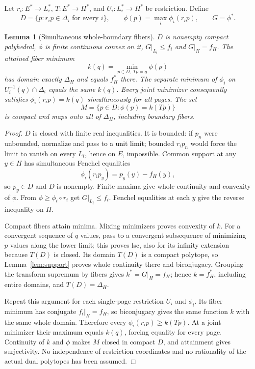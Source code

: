 \documentclass[11pt]{article}
\newtheorem{lemma}[theorem]{Lemma}
\begin{document}
Let $r_i:E^*\to L_i^*$, $T:E^*\to H^*$, and $U_i:L_i^*\to H^*$ be restriction. Define
\[
D=\{p:r_i p\in\Delta_i\text{ for every }i\},\qquad
\phi(p)=\max_i\phi_i(r_i p),\qquad G=\phi^*.
\]
\begin{lemma}[Simultaneous whole-boundary fibers]\label{lem:fibers}
$D$ is nonempty compact polyhedral, $\phi$ is finite continuous convex on it, $G|_{L_i}\leq f_i$ and $G|_H=f_H$. The attained fiber minimum
\[
k(q)=\min_{p\in D,\ Tp=q}\phi(p)
\]
has domain exactly $\Delta_H$ and equals $f_H^*$ there. The separate minimum of $\phi_i$ on $U_i^{-1}(q)\cap\Delta_i$ equals the same $k(q)$. Every joint minimizer consequently satisfies $\phi_i(r_i p)=k(q)$ simultaneously for all pages. The set
\[
M=\{p\in D:\phi(p)=k(Tp)\}
\]
is compact and maps onto all of $\Delta_H$, including boundary fibers.
\end{lemma}
\begin{proof}
$D$ is closed with finite real inequalities. It is bounded: if $p_n$ were unbounded, normalize and pass to a unit limit; bounded $r_i p_n$ would force the limit to vanish on every $L_i$, hence on $E$, impossible. Common support at any $y\in H$ has simultaneous Fenchel equalities
\[
\phi_i(r_i p_y)=p_y(y)-f_H(y),
\]
so $p_y\in D$ and $D$ is nonempty. Finite maxima give whole continuity and convexity of $\phi$. From $\phi\geq\phi_i\circ r_i$ get $G|_{L_i}\leq f_i$. Fenchel equalities at each $y$ give the reverse inequality on $H$.

Compact fibers attain minima. Mixing minimizers proves convexity of $k$. For a convergent sequence of $q$ values, pass to a convergent subsequence of minimizing $p$ values along the lower limit; this proves lsc, also for its infinity extension because $T(D)$ is closed. Its domain $T(D)$ is a compact polytope, so Lemma~\ref{lem:support} proves whole continuity there and biconjugacy. Grouping the transform supremum by fibers gives $k^*=G|_H=f_H$; hence $k=f_H^*$, including entire domains, and $T(D)=\Delta_H$.

Repeat this argument for each single-page restriction $U_i$ and $\phi_i$. Its fiber minimum has conjugate $f_i|_H=f_H$, so biconjugacy gives the same function $k$ with the same whole domain. Therefore every $\phi_i(r_i p)\geq k(Tp)$. At a joint minimizer their maximum equals $k(q)$, forcing equality for every page. Continuity of $k$ and $\phi$ makes $M$ closed in compact $D$, and attainment gives surjectivity. No independence of restriction coordinates and no rationality of the actual dual polytopes has been assumed.
\end{proof}
\end{document}
